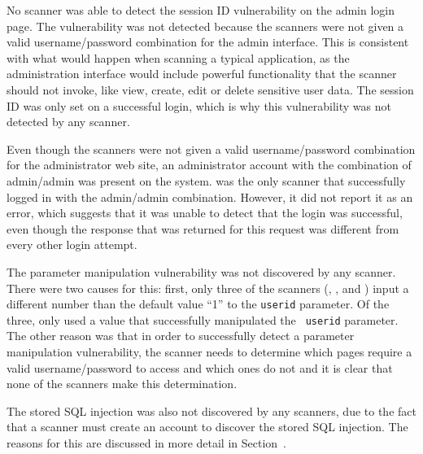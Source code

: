 No scanner was able to detect the session ID vulnerability on the
admin login page. The vulnerability was not detected because the scanners were not given a
valid username/password combination for the admin interface. This
is consistent with what would happen when scanning a typical application, as the
administration interface would include powerful functionality that the scanner
should not invoke, like view, create, edit or delete
sensitive user data.
The session ID was only set on a
successful login, which is why this vulnerability was not detected by any scanner.


Even though the scanners were not given a valid username/password combination
for the administrator web site, an administrator account with the
 combination of admin/admin was present on the system.
\ntospider{} was the only scanner that successfully logged in with the
admin/admin combination. However, it did not report it as an error, which
suggests that it was unable to detect that the login was successful, even
though the response that was returned for this request was different from every other login
attempt.

The parameter manipulation vulnerability was not discovered by any 
scanner. There were two causes for this: first, only three of the
scanners (\appscan{}, \ntospider{}, and \waf{})
input a different number than the default value ``1'' to the {\tt userid}
parameter. Of the 
three, only \ntospider{} used a value that successfully manipulated the {\tt
  userid} parameter. The other reason  was that in order to
successfully detect a parameter manipulation vulnerability, the scanner needs
to determine which pages require a valid username/password to access and which
ones do not and it is clear that none of the scanners make
this determination.

The stored SQL injection was also not discovered by any scanners, due to the
fact that a scanner must create an account to discover the stored SQL
injection. The reasons for this are discussed in more detail in
Section~.

